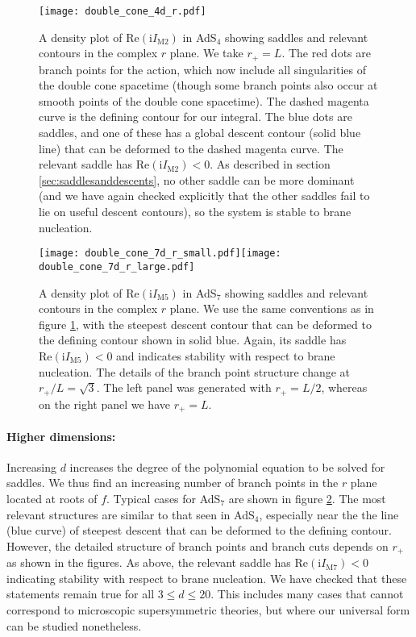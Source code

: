 \documentclass[11pt]{article}
\renewcommand{\i}{\mathrm{i}}
\begin{document}
\begin{figure}[t]
    \centering
    \texttt{[image: double\_cone\_4d\_r.pdf]}
    \caption{A density plot of $\mathrm{Re}\left(\i I_{\mathrm{M}2}\right)$ in AdS$_4$ showing saddles and relevant contours in the complex $r$ plane. We take $r_+ = L$.
    The red dots are branch points for the action, which now include all singularities of the double cone spacetime (though some branch points also occur at smooth points of the double cone spacetime). The dashed magenta curve is the defining contour for our integral.  The blue dots are saddles, and one of these has a global descent contour (solid blue line) that can be deformed to the dashed magenta curve.  The relevant saddle has  $\mathrm{Re}\left(\i I_{\mathrm{M}2}\right) <0$.  As described in section \ref{sec:saddlesanddescents}, no other saddle can be more dominant (and we have again checked explicitly that the other saddles fail to lie on useful descent contours), so the system is stable to brane nucleation.
    }
    \label{fig:ads4}
\end{figure}
\begin{figure}[htb]
    \centering
    \texttt{[image: double\_cone\_7d\_r\_small.pdf]}\hspace{0.5cm}\texttt{[image: double\_cone\_7d\_r\_large.pdf]}
    \caption{A density plot of $\mathrm{Re}\left(\i I_{\mathrm{M}5}\right)$ in AdS$_7$ showing saddles and relevant contours in the complex $r$ plane.  We use the same conventions as in figure \ref{fig:ads4}, with the steepest descent contour that can be deformed to the defining contour shown in solid blue. Again, its saddle has $\mathrm{Re}\left(\i I_{\mathrm{M}5}\right)<0$ and indicates stability with respect to brane nucleation. The details of the branch point structure change at $r_+/L = \sqrt{3}$. The left panel was generated with $r_+=L/2$, whereas on the right panel we have $r_+=L$. }
    \label{fig:ads7}
\end{figure}

\paragraph{Higher dimensions:}
Increasing $d$ increases the degree of the polynomial equation to be solved for saddles.  
We thus find an increasing number of branch points in the $r$ plane located at roots of $f$. 
Typical cases for AdS$_7$ are shown in figure \ref{fig:ads7}.  
The most relevant structures are similar to that seen in AdS$_4$, especially near the the line (blue curve) of steepest descent that can be deformed to the defining contour. 
However, the detailed structure of branch points and branch cuts depends on $r_+$ as shown in the figures.
As above, the relevant saddle has $\mathrm{Re}\left(\i I_{\mathrm{M}7}\right)<0$ indicating stability with respect to brane nucleation.  
We have checked that these statements remain true for all $3 \le d \le 20$.
This includes many cases that cannot correspond to microscopic supersymmetric theories, but where our universal form can be studied nonetheless.
\end{document}

